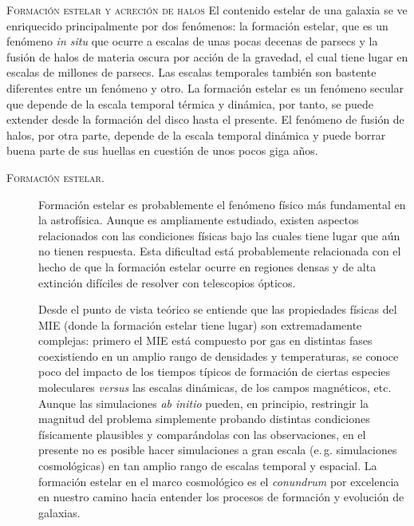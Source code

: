 \documentclass[xcolor=dvipsnames,4pt,hyperref={colorlinks,citecolor=black,linkcolor=black,urlcolor=black}]{beamer}
\begin{document}
\begin{frame}[allowframebreaks]{\textsc{Formación estelar y acreción de halos}}
%
El contenido estelar de una galaxia se ve enriquecido principalmente por dos fenómenos: la formación
estelar, que es un fenómeno \emph{in situ} que ocurre a escalas de unas pocas decenas de parsecs
y la fusión de halos de materia oscura por acción de la gravedad, el cual tiene lugar en escalas de
millones de parsecs.
Las escalas temporales también son bastente diferentes entre un fenómeno y otro. La formación
estelar es un fenómeno secular que depende de la escala temporal térmica y dinámica, por tanto, se
puede extender desde la formación del disco hasta el presente. El fenómeno de fusión de halos, por
otra parte, depende de la escala temporal dinámica y puede borrar buena parte de sus huellas en
cuestión de unos pocos giga años.

\begin{description}
%
\item[\textsc{Formación estelar.}] Formación estelar es probablemente el fenómeno físico más
fundamental en la astrofísica. Aunque es ampliamente estudiado, existen aspectos relacionados con
las condiciones físicas bajo las cuales tiene lugar que aún no tienen respuesta. Esta dificultad
está probablemente relacionada con el hecho de que la formación estelar ocurre en regiones densas y
de alta extinción difíciles de resolver con telescopios ópticos.

Desde el punto de vista teórico se entiende que las propiedades físicas del MIE (donde la formación
estelar tiene lugar) son extremadamente complejas: primero el MIE está compuesto por gas en
distintas fases coexistiendo en un amplio rango de densidades y temperaturas, se conoce poco del
impacto de los tiempos típicos de formación de ciertas especies moleculares \emph{versus} las
escalas dinámicas, de los campos magnéticos, etc. Aunque las simulaciones \emph{ab initio} pueden,
en principio, restringir la magnitud del problema simplemente probando distintas condiciones
físicamente plausibles y comparándolas con las observaciones, en el presente no es posible hacer
simulaciones a gran escala (e.\,g. simulaciones cosmológicas) en tan amplio rango de escalas
temporal y espacial. La formación estelar en el marco cosmológico es el \emph{conundrum} por
excelencia en nuestro camino hacia entender los procesos de formación y evolución de galaxias.


\end{description}
\end{frame}
\end{document}
